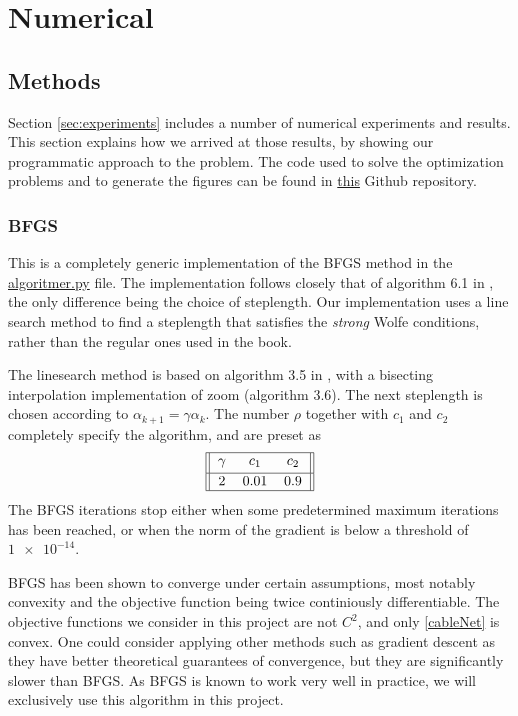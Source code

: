 \section{Numerical}
\subsection{Methods}
Section \ref{sec:experiments} includes a number of numerical experiments and results. This section explains how we arrived at those results, by showing our programmatic approach to the problem. The code used to solve the optimization problems and to generate the figures can be found in \href{https://github.com/otkulseng/Opt1_Project}{this} Github repository.
\subsubsection{BFGS}
This is a completely generic implementation of the BFGS method in the \href{https://github.com/otkulseng/Opt1_Project/blob/main/Kode/algoritmer.py}{algoritmer.py} file. The implementation follows closely that of algorithm 6.1 in \cite{NW}, the only difference being the choice of steplength. Our implementation uses a line search method to find a steplength that satisfies the \emph{strong} Wolfe conditions, rather than the regular ones used in the book.

The linesearch method is based on algorithm 3.5 in \cite{NW}, with a bisecting interpolation implementation of zoom (algorithm 3.6). The next steplength is chosen according to $\alpha_{k+1} = \gamma \alpha_k$. The number $\rho$ together with $c_1$ and $c_2$ completely specify the algorithm, and are preset as
\begin{gather*}    
\begin{tabular}{||c c c||} 
 \hline
 $\gamma$ & $c_1$ & $c_2$ \\ [0.5ex] 
 \hline
2 & 0.01 & 0.9  \\ 
 \hline
\end{tabular}
\end{gather*}
The BFGS iterations stop either when some predetermined maximum iterations has been reached, or when the norm of the gradient is below a threshold of $\num{1e-14}$.

BFGS has been shown to converge under certain assumptions, most notably convexity and the objective function being twice continiously differentiable. The objective functions we consider in this project are not $C^2$, and only \eqref{cableNet} is convex. One could consider applying other methods such as gradient descent as they have better theoretical guarantees of convergence, but they are significantly slower than BFGS. As BFGS is known to work very well in practice, we will exclusively use this algorithm in this project.


